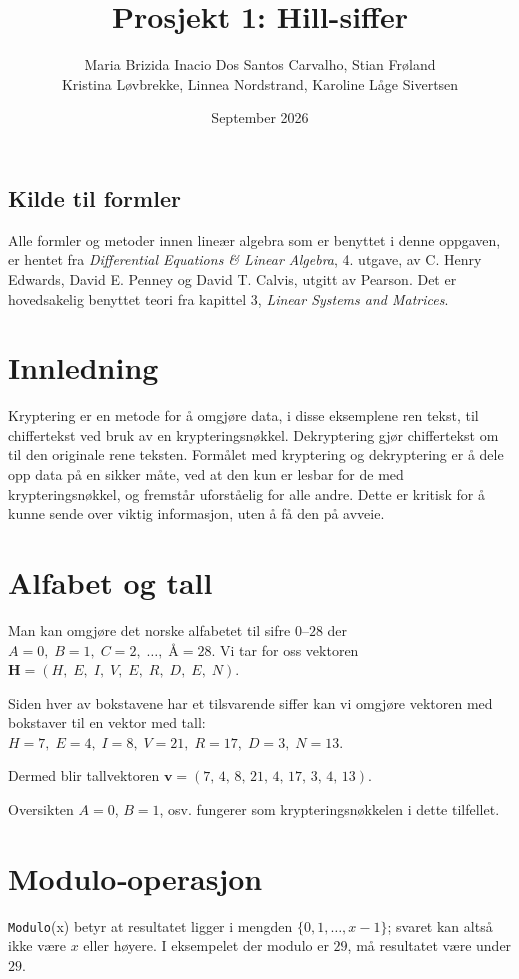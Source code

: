 \documentclass[12pt,a4paper]{article}
\title{Prosjekt 1: Hill-siffer}
\author{ Maria Brizida Inacio Dos Santos Carvalho, Stian Frøland \\ Kristina Løvbrekke, Linnea Nordstrand, Karoline Låge Sivertsen }
\date{September 2026}
\begin{document}
\maketitle
\tableofcontents
\newpage



\subsection*{Kilde til formler} Alle formler og metoder innen lineær algebra som er benyttet i denne oppgaven, er hentet fra \textit{Differential Equations \& Linear Algebra}, 4. utgave, av C. Henry Edwards, David E. Penney og David T. Calvis, utgitt av Pearson. Det er hovedsakelig benyttet teori fra kapittel 3, \textit{Linear Systems and Matrices}.

\section{Innledning}
Kryptering er en metode for å omgjøre data, i disse eksemplene ren tekst,
til chiffertekst ved bruk av en krypteringsnøkkel. Dekryptering gjør
chiffertekst om til den originale rene teksten. Formålet med kryptering og
dekryptering er å dele opp data på en sikker måte, ved at den kun er lesbar
for de med krypteringsnøkkel, og fremstår uforståelig for alle andre.
Dette er kritisk for å kunne sende over viktig informasjon, uten å få den
på avveie.

\section{Alfabet og tall}
Man kan omgjøre det norske alfabetet til sifre $0$–$28$ der
$
A=0,\; B=1,\; C=2,\;\dots ,\; Å=28 .
$
Vi tar for oss vektoren
$
\mathbf{H} = (H,\;E,\;I,\;V,\;E,\;R,\;D,\;E,\;N).
$

Siden hver av bokstavene har et tilsvarende siffer kan vi omgjøre vektoren
med bokstaver til en vektor med tall:
$
H=7,\;E=4,\;I=8,\;V=21,\;R=17,\;D=3,\;N=13 .
$

Dermed blir tallvektoren
$
\mathbf{v} = (7,\,4,\,8,\,21,\,4,\,17,\,3,\,4,\,13).
$

\noindent Oversikten $A=0$, $B=1$, osv. fungerer som krypteringsnøkkelen i dette
tilfellet.

\section{Modulo‑operasjon}
\texttt{Modulo}(x) betyr at resultatet ligger i mengden $\{0,1,\dots ,x-1\}$;
svaret kan altså ikke være $x$ eller høyere. I eksempelet der modulo er $29$,
må resultatet være under $29$.
\end{document}
